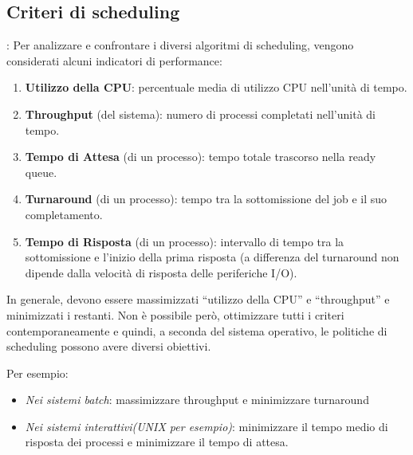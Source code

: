 \documentclass{article}
\begin{document}
\subsection{Criteri di scheduling}:
\noindent Per analizzare e confrontare i diversi algoritmi 
di scheduling, vengono considerati alcuni indicatori di
performance:
\begin{enumerate}
    \item \textbf{Utilizzo della CPU}: percentuale media di
    utilizzo CPU nell'unità di tempo.
    \item \textbf{Throughput} (del sistema): numero di
    processi completati nell'unità di tempo.
    \item \textbf{Tempo di Attesa} (di un processo): tempo
    totale trascorso nella ready queue.
    \item \textbf{Turnaround} (di un processo): tempo tra
    la sottomissione del job e il suo completamento.
    \item \textbf{Tempo di Risposta} (di un processo): 
    intervallo di tempo tra la sottomissione e l'inizio
    della prima risposta (a differenza del turnaround non
     dipende dalla velocità di risposta delle periferiche 
     I/O).
\end{enumerate}

\noindent In generale, devono essere massimizzati
“utilizzo della CPU” e “throughput” e minimizzati i restanti.
Non è possibile però, ottimizzare tutti i criteri
contemporaneamente e quindi, a seconda del sistema operativo,
le politiche di scheduling possono avere diversi obiettivi.

Per esempio: \begin{itemize}
    \item \textit{Nei sistemi batch}: massimizzare throughput e
     minimizzare turnaround
    \item \textit{Nei sistemi interattivi(UNIX per esempio)}: 
    minimizzare il tempo medio di risposta dei processi e
    minimizzare il tempo di attesa.
\end{itemize}
\end{document}

